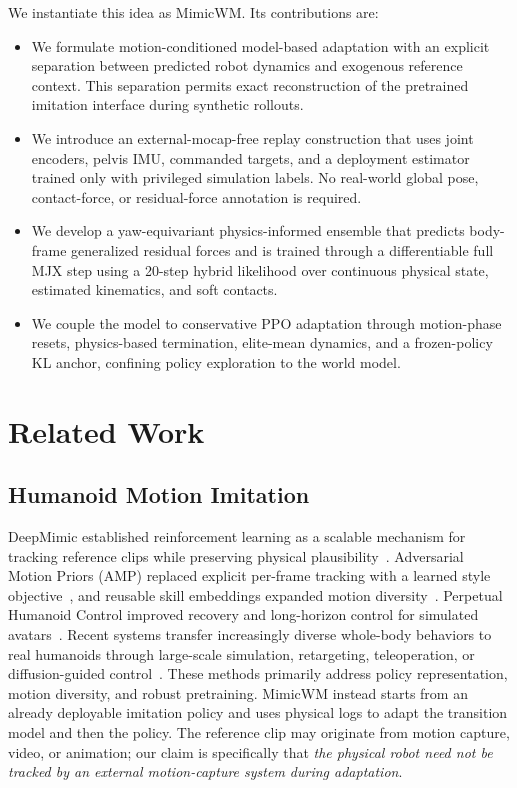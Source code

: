 \documentclass[10pt,twocolumn]{article}
\newcommand{\method}{MimicWM}
\begin{document}
We instantiate this idea as \method{}. Its contributions are:
\begin{itemize}
    \item We formulate motion-conditioned model-based adaptation with an explicit separation between predicted robot dynamics and exogenous reference context. This separation permits exact reconstruction of the pretrained imitation interface during synthetic rollouts.
    \item We introduce an external-mocap-free replay construction that uses joint encoders, pelvis IMU, commanded targets, and a deployment estimator trained only with privileged simulation labels. No real-world global pose, contact-force, or residual-force annotation is required.
    \item We develop a yaw-equivariant physics-informed ensemble that predicts body-frame generalized residual forces and is trained through a differentiable full MJX step using a 20-step hybrid likelihood over continuous physical state, estimated kinematics, and soft contacts.
    \item We couple the model to conservative PPO adaptation through motion-phase resets, physics-based termination, elite-mean dynamics, and a frozen-policy KL anchor, confining policy exploration to the world model.
\end{itemize}

\section{Related Work}
\label{sec:related}

\subsection{Humanoid Motion Imitation}

DeepMimic established reinforcement learning as a scalable mechanism for tracking reference clips while preserving physical plausibility~\cite{peng2018deepmimic}. Adversarial Motion Priors (AMP) replaced explicit per-frame tracking with a learned style objective~\cite{peng2021amp}, and reusable skill embeddings expanded motion diversity~\cite{peng2022ase}. Perpetual Humanoid Control improved recovery and long-horizon control for simulated avatars~\cite{luo2023phc}. Recent systems transfer increasingly diverse whole-body behaviors to real humanoids through large-scale simulation, retargeting, teleoperation, or diffusion-guided control~\cite{he2024teleop,he2025asap,liao2025beyondmimic}. These methods primarily address policy representation, motion diversity, and robust pretraining. \method{} instead starts from an already deployable imitation policy and uses physical logs to adapt the transition model and then the policy. The reference clip may originate from motion capture, video, or animation; our claim is specifically that \emph{the physical robot need not be tracked by an external motion-capture system during adaptation}.
\end{document}
